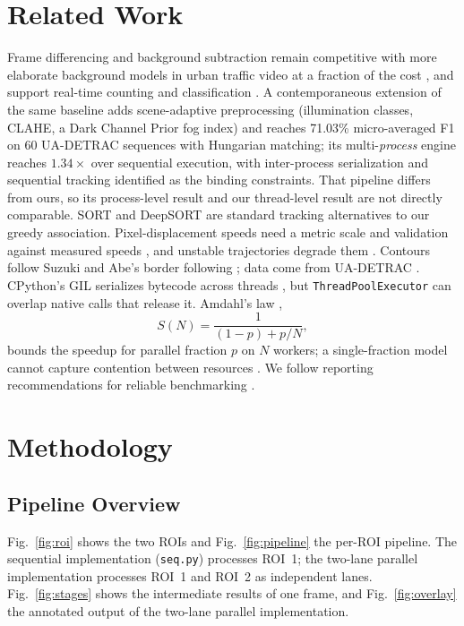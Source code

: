 \documentclass[conference]{IEEEtran}
\newcommand{\code}[1]{\texttt{#1}}
\begin{document}
\section{Related Work}
\label{sec:related}
Frame differencing and background subtraction remain competitive with
more elaborate background models in urban traffic video at a fraction of
the cost \cite{cheung2004}, and support real-time counting and
classification \cite{unzueta2012,crouzil2016}. A contemporaneous
extension of the same baseline \cite{muthuraja2026} adds scene-adaptive
preprocessing (illumination classes, CLAHE, a Dark Channel Prior fog
index) and reaches 71.03\% micro-averaged F1 on 60 UA-DETRAC sequences
with Hungarian matching; its multi-\emph{process} engine reaches
$1.34\times$ over sequential execution, with inter-process serialization
and sequential tracking identified as the binding constraints. That
pipeline differs from ours, so its process-level result and our
thread-level result are not directly comparable. SORT \cite{bewley2016} and DeepSORT \cite{wojke2017}
are standard tracking alternatives to our greedy association.
Pixel-displacement speeds need a metric scale and validation against
measured speeds \cite{kamil2024}, and unstable trajectories degrade them
\cite{sangsuwan2024}. Contours follow Suzuki and Abe's border following
\cite{suzuki1985}; data come from UA-DETRAC \cite{wen2020}. CPython's GIL
serializes bytecode across threads \cite{pythongil}, but
\code{ThreadPoolExecutor} \cite{pythonfutures} can overlap native calls
that release it. Amdahl's law \cite{amdahl1967,alhayanni2020},
\begin{equation}
S(N)=\frac{1}{(1-p)+p/N},
\label{eq:amdahl}
\end{equation}
bounds the speedup for parallel fraction $p$ on $N$ workers; a
single-fraction model cannot capture contention between resources
\cite{poolla2023}. We follow reporting recommendations for reliable
benchmarking \cite{beyer2019,kalibera2013}.

\section{Methodology}
\label{sec:method}

\subsection{Pipeline Overview}
Fig.~\ref{fig:roi} shows the two ROIs and Fig.~\ref{fig:pipeline} the
per-ROI pipeline. The sequential implementation (\code{seq.py})
processes ROI~1; the two-lane parallel implementation processes ROI~1 and
ROI~2 as independent lanes. Fig.~\ref{fig:stages}
shows the intermediate results of one frame, and Fig.~\ref{fig:overlay}
the annotated output of the two-lane parallel implementation.
\end{document}
